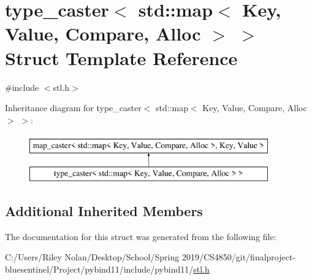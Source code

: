 \hypertarget{structtype__caster_3_01std_1_1map_3_01_key_00_01_value_00_01_compare_00_01_alloc_01_4_01_4}{}\section{type\+\_\+caster$<$ std\+::map$<$ Key, Value, Compare, Alloc $>$ $>$ Struct Template Reference}
\label{structtype__caster_3_01std_1_1map_3_01_key_00_01_value_00_01_compare_00_01_alloc_01_4_01_4}


{\ttfamily \#include $<$stl.\+h$>$}

Inheritance diagram for type\+\_\+caster$<$ std\+::map$<$ Key, Value, Compare, Alloc $>$ $>$\+:\begin{figure}[H]
\begin{center}
\leavevmode
\includegraphics[height=2.000000cm]{structtype__caster_3_01std_1_1map_3_01_key_00_01_value_00_01_compare_00_01_alloc_01_4_01_4}
\end{center}
\end{figure}
\subsection*{Additional Inherited Members}


The documentation for this struct was generated from the following file\+:\begin{DoxyCompactItemize}
\item 
C\+:/\+Users/\+Riley Nolan/\+Desktop/\+School/\+Spring 2019/\+C\+S4850/git/finalproject-\/bluesentinel/\+Project/pybind11/include/pybind11/\mbox{\hyperlink{stl_8h}{stl.\+h}}\end{DoxyCompactItemize}
